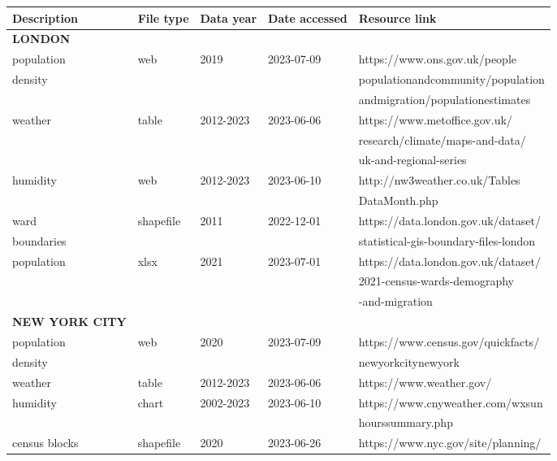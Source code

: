\begin{table}[htbp]
\small
\begin{adjustwidth}{-1in}{-1in} %
\centering
\begin{tabular}{lllll}
\toprule
Description &  File type & Data year & Date accessed &  Resource link \\
\midrule
\textbf{LONDON} & {} & {} & {} & {}\\
population &        web &             2019 &    2023-07-09 &  https://www.ons.gov.uk/people \\
density & {} & {} & {} & populationandcommunity/population \\
{} & {} & {} & {} & andmigration/populationestimates \\
weather &      table &        2012-2023 &    2023-06-06 &  https://www.metoffice.gov.uk/ \\
{} & {} & {} & {} & research/climate/maps-and-data/ \\
{} & {} & {} & {} & uk-and-regional-series \\
humidity &        web &        2012-2023 &    2023-06-10 &  http://nw3weather.co.uk/Tables \\
{} & {} & {} & {} & DataMonth.php \\
ward &  shapefile &             2011 &    2022-12-01 &  https://data.london.gov.uk/dataset/ \\
boundaries & {} & {} & {} & statistical-gis-boundary-files-london \\
population &       xlsx &             2021 &    2023-07-01 &  https://data.london.gov.uk/dataset/ \\
{} & {} & {} & {} & 2021-census-wards-demography \\
{} & {} & {} & {} & -and-migration \\
\midrule
\textbf{NEW YORK CITY} & {} & {} & {} & {}\\
population &        web &             2020 &    2023-07-09 &  https://www.census.gov/quickfacts/ \\
density & {} & {} & {} & newyorkcitynewyork \\
weather &      table &        2012-2023 &    2023-06-06 &                           https://www.weather.gov/ \\
humidity &      chart &        2002-2023 &    2023-06-10 &  https://www.cnyweather.com/wxsun \\
{} & {} & {} & {} & hourssummary.php \\
census blocks &  shapefile &             2020 &    2023-06-26 &  https://www.nyc.gov/site/planning/ \\

\end{tabular}
\end{adjustwidth}
\end{table}
